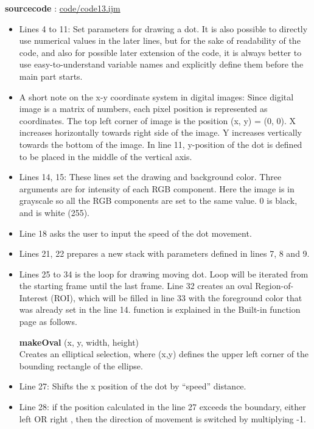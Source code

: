 \textbf{sourcecode} : \href{http://www.example.com/contents}{code/code13.ijm}

\begin{itemize}
\item Lines 4 to 11: Set parameters for drawing a dot. It is also possible to directly use numerical values in the later lines, but for the sake of readability of the code, and also for possible later extension of the code, it is always better to use easy-to-understand variable names and explicitly define them before the main part starts. 
\item A short note on the x-y coordinate system in digital images: Since digital image is a matrix of numbers, each pixel position is represented as coordinates. The top left corner of image is the position (x, y) = (0, 0). X increases horizontally towards right side of the image. Y increases vertically towards the bottom of the image.  In line 11, y-position of the dot is defined to be placed in the middle of the vertical axis. 
\item Lines 14, 15: These lines set the drawing and background color. Three arguments are for intensity of each RGB component. Here the image is in grayscale so all the RGB components are set to the same value. 0 is black, and  is white (255).
\item Line 18 asks the user to input the speed of the dot movement.
\item Lines 21, 22 prepares a new stack with parameters defined in lines 7, 8 and 9.
\item Lines 25 to 34 is the loop for drawing moving dot. Loop will be iterated from the starting frame until the last frame. Line 32 creates an oval Region-of-Interest (ROI), which will be filled in line 33 with the foreground color that was already set in the line 14.  function is explained in the Built-in function page as follows.

\begin{indentCom}
\textbf{makeOval} (x, y, width, height)\\
Creates an elliptical selection, where (x,y) defines the upper left corner of the bounding rectangle of the ellipse. 

\end{indentCom}
\item Line 27: Shifts the x position of the dot by ``speed'' distance. 
\item Line 28: if the position calculated in the line 27 exceeds the boundary, either left  OR right , then the direction of movement is switched by multiplying -1.

\end{itemize}

